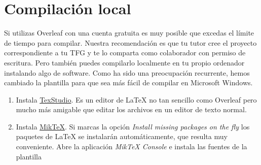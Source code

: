 \section{Compilación local} 
\label{sec:local}

Si utilizas Overleaf con una cuenta gratuita es muy posible que excedas el límite de tiempo para compilar. Nuestra recomendación es que tu tutor cree el proyecto correspondiente a tu TFG y te lo comparta como colaborador con permiso de escritura.  Pero también puedes compilarlo localmente en tu propio ordenador instalando algo de software. Como ha sido una preocupación recurrente, hemos cambiado la plantilla para que sea más fácil de compilar en Microsoft Windows.

\begin{enumerate}
\item Instala \href{https://www.texstudio.org/}{TexStudio}. Es un editor de \LaTeX{} no tan sencillo como Overleaf pero mucho más amigable que editar los archivos en un editor de texto normal.
\item Instala \href{https://miktex.org/download}{MikTeX}. Si marcas la opción \emph{Install missing packages on the fly} los paquetes de \LaTeX{} se instalarán automáticamente, que resulta muy conveniente. Abre la aplicación \emph{MikTeX Console} e instala las fuentes de la plantilla
\end{enumerate}
